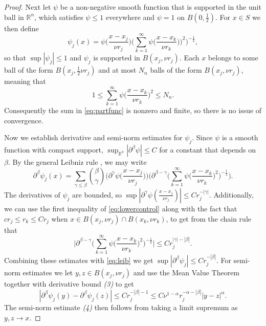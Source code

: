 \documentclass[oneside,hidelinks,indentfirst,10pt]{book}
\begin{document}
\begin{proof}
Next let \(\psi\) be a non-negative smooth function that is supported in the unit ball in \(\mathbb{R}^n\), which satisfies \(\psi\leq 1\) everywhere and \(\psi=1\) on \(B(0,\frac{1}{2})\). For \(x\in S\) we then define
\begin{equation}\label{eq:partfunc}
    \psi_j(x)=\psi\bigg(\frac{x-x_j}{\nu r_j}\bigg)\bigg(\sum_{k=1}^\infty\psi\bigg(\frac{x-x_k}{\nu r_k})\bigg)^2\bigg)^{-\frac{1}{2}},
\end{equation}
so that \(\sup|\psi_j|\leq 1\) and \(\psi_j\) is supported in \(B(x_j,\nu r_j)\). Each \(x\) belongs to some ball of the form \(B(x_j,\frac{1}{2}\nu r_j)\) and at most \(N_n\) balls of the form \(B(x_j,\nu r_j)\), meaning that 
\begin{equation}\label{eq:lowercontrol}
    1\leq \sum_{k=1}^\infty\psi\bigg(\frac{x-x_k}{\nu r_k}\bigg)^2\leq N_n.
\end{equation}
Consequently the sum in \eqref{eq:partfunc} is nonzero and finite, so there is no issue of convergence.

Now we establish derivative and semi-norm estimates for \(\psi_j\). Since \(\psi\) is a smooth function with compact support, \(\sup_{\mathbb{R}^n}|\partial^\beta\psi|\leq C \) for a constant that depends on \(\beta\). By the general Leibniz rule , we may write
\begin{equation}\label{eq:leib}
    \partial^\beta\psi_j(x)=\sum_{\gamma\leq\beta}\binom{\beta}{\gamma}\bigg(\partial^\gamma\psi\bigg(\frac{x-x_j}{\nu r_j}\bigg)\bigg)\bigg(\partial^{\beta-\gamma}\bigg(\sum_{k=1}^\infty\psi\bigg(\frac{x-x_{k}}{\nu r_k}\bigg)^2\bigg)^{-\frac{1}{2}}\bigg).
\end{equation}
The derivatives of \(\psi_j\) are bounded, so \(\sup|\partial^\gamma\psi(\frac{x-x_j}{\nu r_j})|\leq C r_j^{-|\gamma|}\). Additionally, we can use the first inequality of \eqref{eq:lowercontrol} along with the fact that \(cr_j\leq r_k\leq Cr_j\) when \(x\in B(x_j,\nu r_j)\cap B(x_k,\nu r_k) \), to get from the chain rule  that 
\[
    \bigg|\partial^{\beta-\gamma}\bigg(\sum_{k=1}^\infty\psi\bigg(\frac{x-x_{k}}{\nu r_k}\bigg)^2\bigg)^{-\frac{1}{2}}\bigg|\leq Cr_j^{|\gamma|-|\beta|}.
\]
Combining these estimates with \eqref{eq:leib} we get \(\sup|\partial^\beta \psi_j|\leq Cr_j^{-|\beta|}\). For semi-norm estimates we let \(y,z\in B(x_j,\nu r_j)\) and use the Mean Value Theorem together with derivative bound \textit{(3)} to get
\[
    |\partial^\beta\psi_j(y)-\partial^\beta\psi_j(z)|\leq Cr_j^{-|\beta|-1}\leq  C\nu^{1-\alpha} r_j^{-\alpha-|\beta|}|y-z|^\alpha.
\]
The semi-norm estimate \textit{(4)} then follows from taking a limit supremum as \(y,z\rightarrow x\).



\end{proof}
\end{document}
